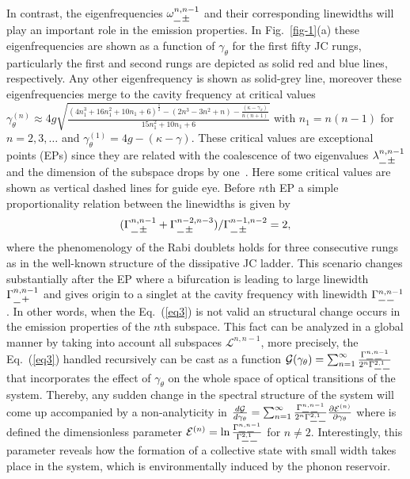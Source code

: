 \documentclass[aps,prl,showpacs,twocolumn]{revtex4}
\newcommand{\pms}{\mathbin{\tikz[x=1.4ex,y=1.4ex,line width=.1ex] \draw (0.0,0) -- (1.0,0) (0.5,0.08) -- (0.5,0.92) (0.0,0.5) -- (1.0,0.5);}}%
\newcommand{\p}{\mathbin{\tikz[x=1.4ex,y=1.4ex,line width=.1ex] \draw (0.0,0) -- (0.0,0) (0.5,0.08) -- (0.5,0.92) (0.0,0.5) -- (1.0,0.5);}}%
\newcommand{\m}{\mathbin{\tikz[x=1.4ex,y=1.4ex,line width=.1ex] \draw (0.0,0) -- (1.0,0) ;}}
\begin{document}
In contrast, the eigenfrequencies $\omega^{n,n-1}_{\m\,\pms}$ and their corresponding linewidths will play an important role in the emission properties. In Fig.~\ref{fig-1}(a) these eigenfrequencies are shown as a function of $\gamma_{\theta}$ for the first fifty JC rungs, particularly the first and second rungs are depicted as solid red and blue lines, respectively. Any other eigenfrequency is shown as solid-grey line, moreover these eigenfrequencies merge to the cavity frequency at critical values $\gamma^{(n)}_{\theta}\approx 4g\sqrt{\frac{(4n_{1}^3+16n_{1}^{2}+10n_{1}+6)^\frac{1}{2}-(2n^3-3n^2+n)-\frac{(\kappa-\gamma_x)}{n(n+1)}}{15n_{1}^{2}+10n_{1}+6}}$ with $n_1=n(n-1)$ for $n=2,3,\dots$ and $\gamma_\theta^{(1)}=4g-(\kappa-\gamma)$. These critical values are exceptional points (EPs) since they are related with the coalescence of two eigenvalues $\lambda^{n,n-1}_{\m\,\pms}$ and the dimension of the subspace drops by one~\cite{Rotter:2010}. Here some critical values are shown as vertical dashed lines for guide eye. Before $n$th EP a simple proportionality relation between the linewidths is given by 
%
\begin{equation}\label{eq3}
(\Gamma^{n,n-1}_{\m\,\pms}+\Gamma^{n-2,n-3}_{\m\,\pms})/\Gamma^{n-1,n-2}_{\m\,\pms}=2,
\end{equation}
%
where the phenomenology of the Rabi doublets holds for three consecutive rungs as in the well-known structure of  the dissipative JC ladder. This scenario changes substantially after the EP where a bifurcation is leading to large linewidth $\Gamma^{n,n-1}_{\m\,\p}$
and gives origin to a singlet at the cavity frequency with linewidth $\Gamma^{n,n-1}_{\m\,\m}$. In other words, when the Eq.~(\ref{eq3}) is not valid an structural change occurs in the emission properties of the $n$th subspace. This fact can be analyzed in a global manner by taking into account all subspaces  $\mathcal{L}^{n,n-1}$, more precisely, the Eq.~(\ref{eq3}) handled recursively can be cast as a function $\mathcal{G}(\gamma_{\theta})=\sum_{n=1}^{\infty}\frac{\Gamma^{n,n-1}_{\m\,\m}}{2^n\Gamma^{2,1}_{\m\,\m}}$ that incorporates the effect of $\gamma_{\theta}$ on the whole space of optical transitions of the system. Thereby, any sudden change in the spectral structure of the system will come up accompanied by a non-analyticity in $\frac{d\mathcal{G}}{d\gamma_{\theta}}=\sum_{n=1}^{\infty}
\frac{\Gamma^{n,n-1}_{\m\,\m}}{2^n\Gamma^{2,1}_{\m\,\m}}\frac{\partial \mathcal{E}^{(n)}}{\partial \gamma_{\theta}}$
where is defined the dimensionless parameter $\mathcal{E}^{(n)}=\ln\frac{\Gamma^{n,n-1}_{\m\,\m}}{\Gamma^{2,1}_{\m\,\m}}$ for $n\neq2$. Interestingly, this parameter reveals how the formation of a collective state with small width takes place in the system, which is environmentally induced by the phonon reservoir.
\end{document}
